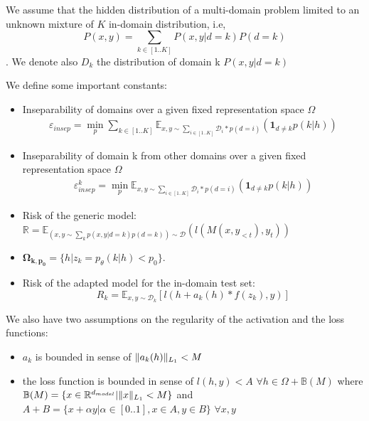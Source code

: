 \documentclass[12pt,a4paper,twoside]{report}
\theoremstyle{definition}
\newcommand{\fyTodo}[1]{\Todo[FY:]{\textcolor{orange}{#1}}}
\begin{document}
We assume that the hidden distribution of a multi-domain problem limited to an unknown mixture of $K$ in-domain distribution, i.e, $$P(x,y) = \sum_{k\in[1..K]}P(x,y|d=k)P(d=k)$$. We denote also $D_k$ the distribution of domain k $P(x,y|d=k)$

We define some important constants:
\begin{itemize}
\item Inseparability of domains over a given fixed representation space $\Omega$
\begin{equation}
  \begin{split}
  \mathbb{\varepsilon}_{insep} = \min_{p} \sum_{k\in[1..K]} \mathbb{E}_{x,y \sim \sum_{i\in [1..K]} \mathcal{D}_{i}*p(d=i)}(\mathbf{1}_{d\neq k} p(k|h))
  \end{split}
  \end{equation}
\item Inseparability of domain k from other domains over a given fixed representation space $\Omega$
  \begin{equation}
  \begin{split}
  \mathbb{\varepsilon}_{insep}^k = \min_{p} \mathbb{E}_{x,y \sim \sum_{i\in [1..K]} \mathcal{D}_{i}*p(d=i)}(\mathbf{1}_{d\neq k} p(k|h))
  \end{split}
  \end{equation}
\item Risk of the generic model: $\mathbb{R} = \mathbb{E}_{(x,y \sim \sum_{k}p(x,y|d=k)p(d=k)) \sim \mathcal{D}}(l(M(x,y_{<t}), y_t))$ \fyTodo{wrt to which distribution ?}
\item $\mathbf{\Omega_{k,p_{0}}} = \lbrace h | z_k = p_\theta(k|h) < p_0\rbrace$.
\item Risk of the adapted model for the in-domain test set:
  $$R_k = \mathbb{E}_{x,y \sim \mathcal{D}_k} [l(h + a_k(h) * f(z_k), y)]$$
\end{itemize}

We also have two assumptions on the regularity of the activation and the loss functions:
\begin{itemize}
\item $a_k$ is bounded in sense of $\normL{a_k(h)} < M$
\item the loss function is bounded in sense of $l(h,y) < A$ $\forall h \in \Omega + \mathbb{B}(M)$ where $\mathbb{B}(M)=\lbrace x\in \mathbb{R}^{d_{model}} | \normL{x}<M \rbrace$ and $A+B = \lbrace x+ \alpha y  | \alpha \in [0..1], x \in A, y \in B \rbrace$  \fyTodo{why not $l(h,y) < A$ ?}
  $\forall x,y$
\end{itemize}
\end{document}
